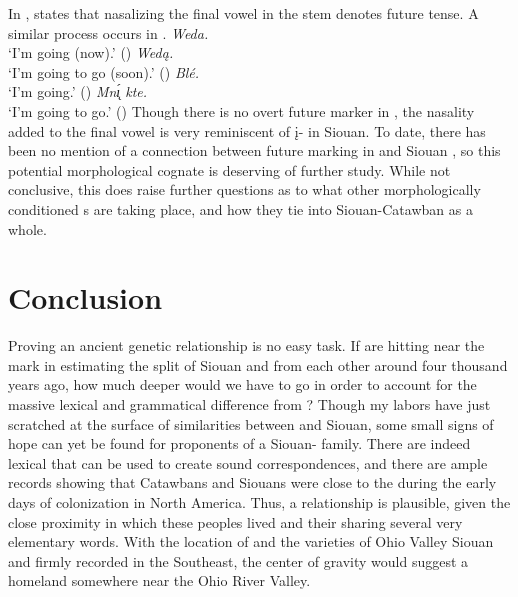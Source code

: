 \documentclass[output=paper]{LSP/langsci}
\begin{document}
In , \citet{Linn2000} states that nasalizing the final vowel in the stem denotes future tense. A similar process occurs in .
\ea
	\ea \textit{Weda.} \hfill {}\\
		`I'm going (now).' (\citealt[279]{Linn2000})
	\ex \textit{Wed\k{a}.} \hfill {}\\
		`I'm going to go (soon).' (\citealt[279]{Linn2000})
	\ex \textit{Bl\'e.} \hfill {}\\
		`I'm going.' (\citealt[75]{Ullrich2008})
	\ex \textit{Mn\k{\'\i} kte.} \hfill {}\\
		`I'm going to go.' (\citealt[75]{Ullrich2008})
	\z
\z
Though there is no overt future marker in , the nasality added to the final vowel is very reminiscent of \k{i}- in Siouan. To date, there has been no mention of a connection between future marking in  and Siouan , so this potential morphological cognate is deserving of further study. While not conclusive, this  does raise further questions as to what other morphologically conditioned s are taking place, and how they tie into Siouan-Catawban as a whole.

\section{Conclusion}\label{sec:kasak:6}

Proving an ancient genetic relationship is no easy task. If \citet{ParksRankin2001} are hitting near the mark in estimating the split of Siouan and  from each other around four thousand years ago, how much deeper would we have to go in order to account for the massive lexical and grammatical difference from ? Though my labors have just scratched at the surface of similarities between  and Siouan, some small signs of hope can yet be found for proponents of a Siouan- family. There are indeed lexical  that can be used to create sound correspondences, and there are ample records showing that Catawbans and Siouans were close to the  during the early days of colonization in North America. Thus, a relationship is plausible, given the close proximity in which these peoples lived and their sharing several very elementary words. With the location of  and the varieties of Ohio Valley Siouan and  firmly recorded in the Southeast, the center of gravity would suggest a homeland somewhere near the Ohio River Valley.
\end{document}
